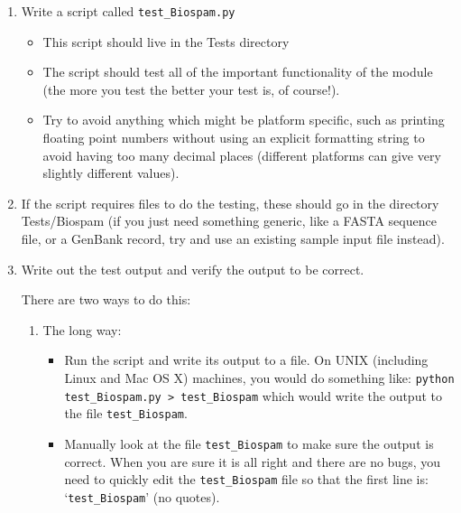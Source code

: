 \documentclass{report}
\begin{document}
\begin{enumerate}
  \item Write a script called \verb|test_Biospam.py|

  \begin{itemize}

    \item This script should live in the Tests directory
      
     \item The script should test all of the important functionality
     of the module (the more you test the better your test is, of course!).
    
     \item Try to avoid anything which might be platform specific,
     such as printing floating point numbers without using an explicit
     formatting string to avoid having too many decimal places
     (different platforms can give very slightly different values).

  \end{itemize}
      
  \item If the script requires files to do the testing, these should go in
       the directory Tests/Biospam (if you just need something generic, like
       a FASTA sequence file, or a GenBank record, try and use an existing
       sample input file instead).
      
  \item Write out the test output and verify the output to be correct.

       There are two ways to do this:

  \begin{enumerate}
    \item The long way:

    \begin{itemize}
      
     \item Run the script and write its output to a file. On UNIX (including
       Linux and Mac OS X) machines, you would do something like:
       \verb|python test_Biospam.py > test_Biospam| which would write the
       output to the file \verb|test_Biospam|.
      
     \item Manually look at the file \verb|test_Biospam| to make sure the output is correct. When you are sure it is all right and there are no bugs, you need to quickly edit the \verb|test_Biospam| file so that the first line is: `\verb|test_Biospam|' (no quotes).


\end{itemize}
\end{enumerate}
\end{enumerate}
\end{document}
